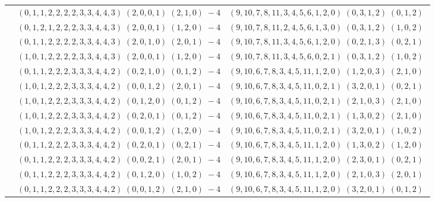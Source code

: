 \documentclass[11pt]{article}
\begin{document}
\begin{longtable}[l]{|c|c|c|}
 \cline{2-3} 
 & $(0 ,1 ,1 ,2 ,2 ,2 ,2 ,3 ,3 ,4 ,4 ,3) \;(2 ,0 ,0 ,1) \;(2 ,1 ,0) \;-4$ & $(9 ,10 ,7 ,8 ,11 ,3 ,4 ,5 ,6 ,1 ,2 ,0) \;(0 ,3 ,1 ,2) \;(0 ,1 ,2) \;$\\ 
 \cline{2-3} 
 & $(0 ,1 ,2 ,1 ,2 ,2 ,2 ,3 ,3 ,4 ,4 ,3) \;(2 ,0 ,0 ,1) \;(1 ,2 ,0) \;-4$ & $(9 ,10 ,7 ,8 ,11 ,2 ,4 ,5 ,6 ,1 ,3 ,0) \;(0 ,3 ,1 ,2) \;(1 ,0 ,2) \;$\\ 
 \cline{2-3} 
 & $(0 ,1 ,1 ,2 ,2 ,2 ,2 ,3 ,3 ,4 ,4 ,3) \;(2 ,0 ,1 ,0) \;(2 ,0 ,1) \;-4$ & $(9 ,10 ,7 ,8 ,11 ,3 ,4 ,5 ,6 ,1 ,2 ,0) \;(0 ,2 ,1 ,3) \;(0 ,2 ,1) \;$\\ 
 \cline{2-3} 
 & $(1 ,0 ,1 ,2 ,2 ,2 ,2 ,3 ,3 ,4 ,4 ,3) \;(2 ,0 ,0 ,1) \;(1 ,2 ,0) \;-4$ & $(9 ,10 ,7 ,8 ,11 ,3 ,4 ,5 ,6 ,0 ,2 ,1) \;(0 ,3 ,1 ,2) \;(1 ,0 ,2) \;$\\ 
 \cline{2-3} 
 & $(0 ,1 ,1 ,2 ,2 ,2 ,3 ,3 ,3 ,4 ,4 ,2) \;(0 ,2 ,1 ,0) \;(0 ,1 ,2) \;-4$ & $(9 ,10 ,6 ,7 ,8 ,3 ,4 ,5 ,11 ,1 ,2 ,0) \;(1 ,2 ,0 ,3) \;(2 ,1 ,0) \;$\\ 
 \cline{2-3} 
 & $(1 ,0 ,1 ,2 ,2 ,2 ,3 ,3 ,3 ,4 ,4 ,2) \;(0 ,0 ,1 ,2) \;(2 ,0 ,1) \;-4$ & $(9 ,10 ,6 ,7 ,8 ,3 ,4 ,5 ,11 ,0 ,2 ,1) \;(3 ,2 ,0 ,1) \;(0 ,2 ,1) \;$\\ 
 \cline{2-3} 
 & $(1 ,0 ,1 ,2 ,2 ,2 ,3 ,3 ,3 ,4 ,4 ,2) \;(0 ,1 ,2 ,0) \;(0 ,1 ,2) \;-4$ & $(9 ,10 ,6 ,7 ,8 ,3 ,4 ,5 ,11 ,0 ,2 ,1) \;(2 ,1 ,0 ,3) \;(2 ,1 ,0) \;$\\ 
 \cline{2-3} 
 & $(1 ,0 ,1 ,2 ,2 ,2 ,3 ,3 ,3 ,4 ,4 ,2) \;(0 ,2 ,0 ,1) \;(0 ,1 ,2) \;-4$ & $(9 ,10 ,6 ,7 ,8 ,3 ,4 ,5 ,11 ,0 ,2 ,1) \;(1 ,3 ,0 ,2) \;(2 ,1 ,0) \;$\\ 
 \cline{2-3} 
 & $(1 ,0 ,1 ,2 ,2 ,2 ,3 ,3 ,3 ,4 ,4 ,2) \;(0 ,0 ,1 ,2) \;(1 ,2 ,0) \;-4$ & $(9 ,10 ,6 ,7 ,8 ,3 ,4 ,5 ,11 ,0 ,2 ,1) \;(3 ,2 ,0 ,1) \;(1 ,0 ,2) \;$\\ 
 \cline{2-3} 
 & $(0 ,1 ,1 ,2 ,2 ,2 ,3 ,3 ,3 ,4 ,4 ,2) \;(0 ,2 ,0 ,1) \;(0 ,2 ,1) \;-4$ & $(9 ,10 ,6 ,7 ,8 ,3 ,4 ,5 ,11 ,1 ,2 ,0) \;(1 ,3 ,0 ,2) \;(1 ,2 ,0) \;$\\ 
 \cline{2-3} 
 & $(0 ,1 ,1 ,2 ,2 ,2 ,3 ,3 ,3 ,4 ,4 ,2) \;(0 ,0 ,2 ,1) \;(2 ,0 ,1) \;-4$ & $(9 ,10 ,6 ,7 ,8 ,3 ,4 ,5 ,11 ,1 ,2 ,0) \;(2 ,3 ,0 ,1) \;(0 ,2 ,1) \;$\\ 
 \cline{2-3} 
 & $(0 ,1 ,1 ,2 ,2 ,2 ,3 ,3 ,3 ,4 ,4 ,2) \;(0 ,1 ,2 ,0) \;(1 ,0 ,2) \;-4$ & $(9 ,10 ,6 ,7 ,8 ,3 ,4 ,5 ,11 ,1 ,2 ,0) \;(2 ,1 ,0 ,3) \;(2 ,0 ,1) \;$\\ 
 \cline{2-3} 
 & $(0 ,1 ,1 ,2 ,2 ,2 ,3 ,3 ,3 ,4 ,4 ,2) \;(0 ,0 ,1 ,2) \;(2 ,1 ,0) \;-4$ & $(9 ,10 ,6 ,7 ,8 ,3 ,4 ,5 ,11 ,1 ,2 ,0) \;(3 ,2 ,0 ,1) \;(0 ,1 ,2) \;$\\ 

\end{longtable}
\end{document}
